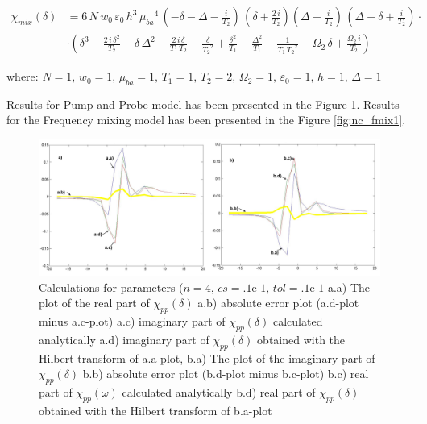 \documentclass[12pt,twoside,a4paper]{article}
\numberwithin{equation}{subsection}
\numberwithin{figure}{subsection}
\begin{document}
\begin{align} \label{eq:nc_chimix}
  {\chi_{mix}}(\delta ) &= 6\,N\,{w_{0}}\,\varepsilon_0\,h^{3}\,{\mu_{\mathit{ba}}}^{4}
   \,( - \delta  - \Delta  - \frac {i}{{T_{2}}})
   \,(\delta  + \frac{2\,i}{{T_{2}}}) (\Delta  + \frac {i}{{T_{2}}})\,(\Delta  + \delta  + \frac
  {i}{{T_{2}}})\cdot \\
  & \cdot	(\delta ^{3} - \frac {2\,i\,\delta ^{2}}{{T_{2}}} - \delta \,\Delta ^{2} - \frac {2\,i\,\delta }{{T_{1}}\,{T_{2}}}
  - \frac {\delta }{{T_{2}}^{2}} + \frac {\delta ^{2}}{{T_{1}}} - \frac {\Delta ^{2}}{{T_{1}}} - \frac {1}{{T_{1}}\,{T_{2}}^{2}} -
  {\Omega_{2}}\,\delta  + \frac {{\Omega_{2}}\,i}{{T_{2}}}) \nonumber
\end{align}

where: $N=1, \,{w_{0}}=1, \,{\mu_{ba}}=1, \,{T_{1}}=1, \,{T_{2}}=2, \,{\Omega_{2}}=1, \,{\varepsilon_{0}}=1, \,h=1, \,\Delta =1$

Results for Pump and Probe model has been presented in the Figure \ref{fig:nc_pnp}. Results for the Frequency mixing model has been
presented in the Figure \ref{fig:nc_fmix1}. 

\begin{figure} 
  \includegraphics[width=150mm]{img/nc_pnp.png}
  \caption{Calculations for parameters ($n=4, \,cs=\mbox{.1e-1}, \,tol=\mbox{.1e-1}$
     a.a) The plot of the real part of ${\chi_{pp}}(\delta )$
     a.b) absolute error plot (a.d-plot minus a.c-plot) 
     a.c) imaginary part of ${\chi_{pp}}(\delta )$ calculated analytically 
     a.d) imaginary part of ${\chi_{pp}}(\delta )$ obtained with the Hilbert transform of a.a-plot, 
     b.a) The plot of the imaginary part of ${\chi_{pp}}(\delta )$ 
     b.b) absolute error plot (b.d-plot minus b.c-plot) 
     b.c) real part of $\chi_{pp} (\omega )$ calculated analytically 
     b.d) real part of ${\chi_{pp}}(\delta )$ obtained with the Hilbert transform of b.a-plot 
     \label{fig:nc_pnp}
     }
\end{figure} 
\end{document}
